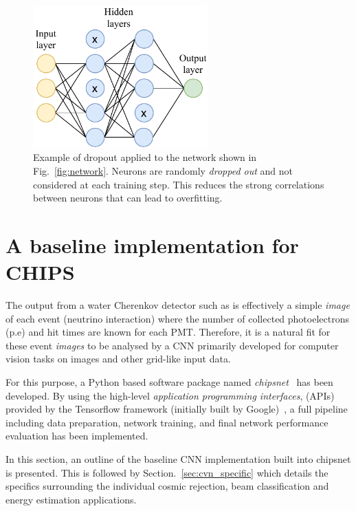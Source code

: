 \begin{figure} %
    \includegraphics[width=0.6\textwidth]{diagrams/6-cvn/dropout.pdf}
    \caption[Illustration of dropout.]
    {Example of dropout applied to the network shown in Fig.~\ref{fig:network}. Neurons are
        randomly \emph{dropped out} and not considered at each training step. This reduces the
        strong correlations between neurons that can lead to overfitting.}
    \label{fig:dropout}
\end{figure}

\section{A baseline implementation for CHIPS} %
\label{sec:cvn_baseline} %

The output from a water Cherenkov detector such as \chips is effectively a simple \emph{image} of
each event (neutrino interaction) where the number of collected photoelectrons (p.e) and hit times
are known for each PMT. Therefore, it is a natural fit for these event \emph{images} to be
analysed by a CNN primarily developed for computer vision tasks on images and other grid-like
input data.

For this purpose, a Python based software package named \emph{chipsnet}~\cite{chipsnet2020} has
been developed. By using the high-level \emph{application programming interfaces}, (APIs) provided
by the Tensorflow framework (initially built by Google)~\cite{tf2015}, a full pipeline including
data preparation, network training, and final network performance evaluation has been implemented.

In this section, an outline of the baseline CNN implementation built into chipsnet is presented.
This is followed by Section.~\ref{sec:cvn_specific} which details the specifics surrounding the
individual cosmic rejection, beam classification and energy estimation applications.

